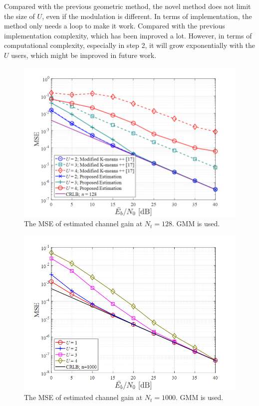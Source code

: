 Compared with the previous geometric method, the novel method does not limit the size of $U$, even if the modulation is different. In terms of implementation, the method only needs a loop to make it work. Compared with the previous implementation complexity, which has been improved a lot. However, in terms of computational complexity, especially in step 2, it will grow exponentially with the $U$ users, which might be improved in future work.

\begin{figure}[t!]
 \centering
 \includegraphics[width=14cm]{fig/channel_gain_mse_128.png}
 \caption{The MSE of estimated channel gain at $N_t=128$. GMM is used.}
 \label{fig:channel_gain_mse_128}
\end{figure}

\begin{figure}[t!]
 \centering
 \includegraphics[width=14cm]{fig/channel_gain_mse_1000.png}
 \caption{The MSE of estimated channel gain at $N_t=1000$. GMM is used.}
 \label{fig:channel_gain_mse_100}
\end{figure}


